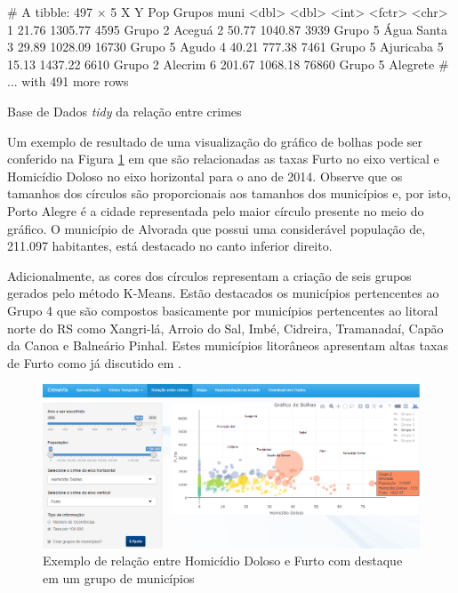 \documentclass[12pt,openright,oneside,a4paper,english,french,spanish]{abntex2}
\numberwithin{table}{section} %
\numberwithin{figure}{section} %
\newcommand{\co}{\citeonline}
\begin{document}
\begin{routput}[H]
\begin{Schunk}
\begin{Soutput}
# A tibble: 497 × 5
       X       Y   Pop  Grupos       muni
   <dbl>   <dbl> <int>  <fctr>      <chr>
1  21.76 1305.77  4595 Grupo 2     Aceguá
2  50.77 1040.87  3939 Grupo 5 Água Santa
3  29.89 1028.09 16730 Grupo 5      Agudo
4  40.21  777.38  7461 Grupo 5  Ajuricaba
5  15.13 1437.22  6610 Grupo 2    Alecrim
6 201.67 1068.18 76860 Grupo 5   Alegrete
# ... with 491 more rows
\end{Soutput}
\end{Schunk}
\caption{Base de Dados \textit{tidy} da relação entre crimes}
\label{out:base_bolha}
\end{routput}

Um exemplo de resultado de uma visualização do gráfico de bolhas pode ser conferido na Figura \ref{fig:relacao_screen} em que são relacionadas as taxas Furto no eixo vertical e Homicídio Doloso no eixo horizontal para o ano de 2014. Observe que os tamanhos dos círculos são proporcionais aos tamanhos dos municípios e, por isto, Porto Alegre é a cidade representada pelo maior círculo presente no meio do gráfico. O município de Alvorada que possui uma considerável população de, 211.097 habitantes, está destacado no canto inferior direito.

Adicionalmente, as cores dos círculos representam a criação de seis grupos gerados pelo método K-Means. Estão destacados os municípios pertencentes ao Grupo 4 que são compostos basicamente por municípios pertencentes ao litoral norte do RS como Xangri-lá, Arroio do Sal, Imbé, Cidreira, Tramanadaí, Capão da Canoa e Balneário Pinhal. Estes municípios litorâneos apresentam altas taxas de Furto como já discutido em \co{cortes2016tdfee}.

\begin{figure}[H]
\centering
\includegraphics[width=.75\linewidth]{screenshot_relacao2.png}
\caption{Exemplo de relação entre Homicídio Doloso e Furto com destaque em um grupo de municípios}
\label{fig:relacao_screen}
\end{figure}
\end{document}
